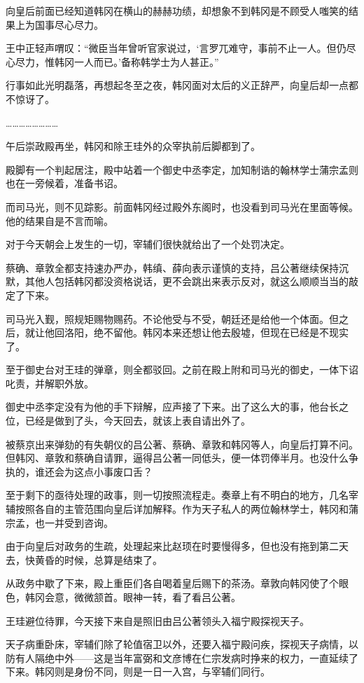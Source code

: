 向皇后前面已经知道韩冈在横山的赫赫功绩，却想象不到韩冈是不顾受人嗤笑的结果上为国事尽心尽力。

王中正轻声喟叹：“微臣当年曾听官家说过，‘言罗兀难守，事前不止一人。但仍尽心尽力，惟韩冈一人而已。’备称韩学士为人甚正。”

行事如此光明磊落，再想起冬至之夜，韩冈面对太后的义正辞严，向皇后却一点都不惊讶了。

……………………

午后崇政殿再坐，韩冈和除王珪外的众宰执前后脚都到了。

殿脚有一个判起居注，殿中站着一个御史中丞李定，加知制诰的翰林学士蒲宗孟则也在一旁候着，准备书诏。

而司马光，则不见踪影。前面韩冈经过殿外东阁时，也没看到司马光在里面等候。他的结果自是不言而喻。

对于今天朝会上发生的一切，宰辅们很快就给出了一个处罚决定。

蔡确、章敦全都支持速办严办，韩缜、薛向表示谨慎的支持，吕公著继续保持沉默，其他人包括韩冈都没资格说话，更不会跳出来表示反对，就这么顺顺当当的敲定了下来。

司马光入觐，照规矩赐物赐药。不论他受与不受，朝廷还是给他一个体面。但之后，就让他回洛阳，绝不留他。韩冈本来还想让他去殷墟，但现在已经是不现实了。

至于御史台对王珪的弹章，则全都驳回。之前在殿上附和司马光的御史，一体下诏叱责，并解职外放。

御史中丞李定没有为他的手下辩解，应声接了下来。出了这么大的事，他台长之位，已经是做到了头，今天回去，就该上表自请出外了。

被蔡京出来弹劾的有失朝仪的吕公著、蔡确、章敦和韩冈等人，向皇后打算不问。但韩冈、章敦和蔡确自请罪，逼得吕公著一同低头，便一体罚俸半月。也没什么争执的，谁还会为这点小事废口舌？

至于剩下的亟待处理的政事，则一切按照流程走。奏章上有不明白的地方，几名宰辅按照各自的主管范围向皇后详加解释。作为天子私人的两位翰林学士，韩冈和蒲宗孟，也一并受到咨询。

由于向皇后对政务的生疏，处理起来比赵顼在时要慢得多，但也没有拖到第二天去，快黄昏的时候，总算是结束了。

从政务中歇了下来，殿上重臣们各自喝着皇后赐下的茶汤。章敦向韩冈使了个眼色，韩冈会意，微微颔首。眼神一转，看了看吕公著。

王珪避位待罪，今天接下来自是照旧由吕公著领头入福宁殿探视天子。

天子病重卧床，宰辅们除了轮值宿卫以外，还要入福宁殿问疾，探视天子病情，以防有人隔绝中外——这是当年富弼和文彦博在仁宗发病时挣来的权力，一直延续了下来。韩冈则是身份不同，则是一日一入宫，与宰辅们同行。

